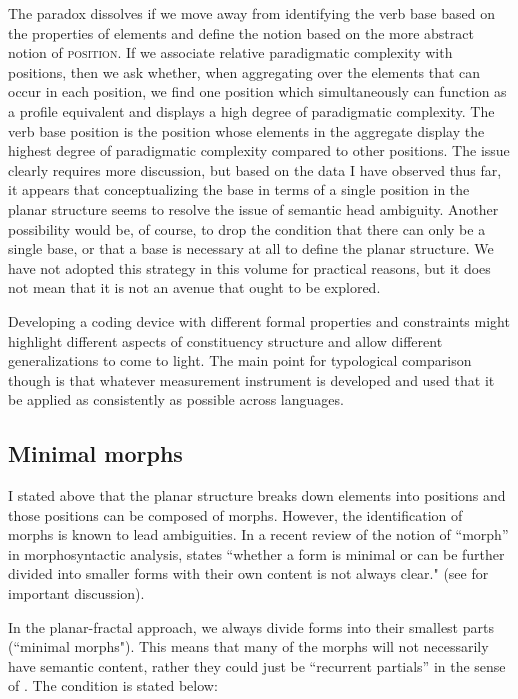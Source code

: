 \documentclass[output=paper,hidelinks]{langscibook}
\begin{document}
The paradox dissolves if we move away from identifying the verb base based on the properties of elements and define the notion based on the more abstract notion of \textsc{position}. If we associate relative paradigmatic complexity with positions, then we ask whether, when aggregating over the elements that can occur in each position, we find one position which simultaneously can function as a profile equivalent and displays a high degree of paradigmatic complexity. The verb base position is the position whose elements in the aggregate display the highest degree of paradigmatic complexity compared to other positions. The issue clearly requires more discussion, but based on the data I have observed thus far, it appears that conceptualizing the base in terms of a single position in the planar structure seems to resolve the issue of semantic head ambiguity. Another possibility would be, of course, to drop the condition that there can only be a single base, or that a base is necessary at all to define the planar structure. We have not adopted this strategy in this volume for practical reasons, but it does not mean that it is not an avenue that ought to be explored. 

Developing a coding device with different formal properties and constraints might highlight different aspects of constituency structure and allow different generalizations to come to light. The main point for typological comparison though is that whatever measurement instrument is developed and used that it be applied as consistently as possible across languages.

\subsection{Minimal morphs}
\label{sec:minimalmorphs}

I stated above that the planar structure breaks down elements into positions and those positions can be composed of morphs. However, the identification of morphs is known to lead ambiguities. In a recent review of the notion of ``morph'' in morphosyntactic analysis, \citet[124]{haspelmath2020morph} states ``whether a form is minimal or can be further divided into smaller forms with their own content is not always clear." (see \citealt{blevins2016word} for important discussion).

In the planar-fractal approach, we always divide forms into their smallest parts (``minimal morphs"). This means that many of the morphs will not necessarily have semantic content, rather they could just be ``recurrent partials'' in the sense of \citet[314]{crysmann2016variable}. The condition is stated below:
\end{document}
